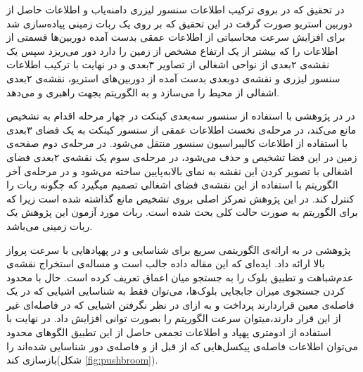 در تحقیق که در  بروی ترکیب اطلاعات سنسور لیزری دامنه‌یاب و اطلاعات حاصل از دوربین استریو صورت گرفت در این تحقیق که بر روی یک ربات زمینی پیاده‌سازی شد برای افزایش سرعت محاسباتی از اطلاعات عمقی بدست آمده دوربین‌ها قسمتی از اطلاعات را که بیشتر از یک ارتفاع مشخص از زمین را دارد دور می‌ریزد سپس یک نقشه‌ی ۲بعدی از نواحی اشغالی از تصاویر ۳بعدی و در نهایت با ترکیب اطلاعات سنسور لیزری و نقشه‌ی دوبعدی بدست آمده از دوربین‌های استریو، نقشه‌ی ۲بعدی اشفالی از محیط را می‌سازد و به الگوریتم  بجهت راهبری و  می‌دهد.

در  در پژوهشی با استفاده از سنسور سه‌بعدی کینکت در چهار مرحله اقدام به تشخیص مانع می‌کند، در مرحله‌ی نخست اطلاعات عمقی از سنسور کینکت به یک فضای ۳بعدی با استفاده از اطلاعات کالیبراسیون سنسور منتقل می‌شود. در مرحله‌ی دوم صفحه‌ی زمین در این فضا تشخیص و حذف می‌شود، در مرحله‌ی سوم یک نقشه‌ی ۲بعدی فضای اشغالی با تصویر کردن این نقشه به نمای بالابه‌پایین ساخته می‌شود و در مرحله‌ی آخر الگوریتم  با استفاده از این نقشه‌ی فضای اشغالی تصمیم میگیرد که چگونه ربات را کنترل کند. در این پژوهش تمرکز اصلی بروی تشخیص مانع گذاشته شده است زیرا که برای الگوریتم  به صورت حالت کلی بحث شده است. ربات مورد آزمون این پژوهش یک ربات زمینی می‌باشد.

پژوهشی در  به ارائه‌ی الگوریتمی سریع برای شناسایی و  در پهپادهایی با سرعت پرواز بالا ارائه داد. ایده‌ای که این مقاله داده جالب است و مساله‌ی استخراج نقشه‌ی عدم‌شباهت و تطبیق بلوک را به جستجو میان اعماق تعریف کرده است. حال با محدود کردن جستجوی میزان جابجایی بلوک‌ها، می‌توان فقط به شناسایی اشیایی که در یک فاصله‌ی معین قراردارند پرداخت و به ازای در نظر نگرفتن اشیایی که در فاصله‌ای غیر از این قرار دارند،میتوان سرعت الگوریتم را بصورت توانی افزایش داد. در نهایت با استفاده از ادومتری پهپاد و اطلاعات تجمعی حاصل از این تطبیق الگوهای محدود می‌توان اطلاعات فاصله‌ی پیکسل‌هایی که از قبل از و فاصله‌ی دور شناسایی شده‌اند را بازسازی کند(شکل \ref{fig:pushbroom}).


